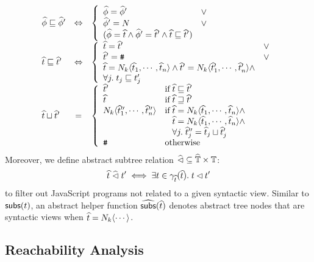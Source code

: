 \[
  \begin{array}{lcl}
    \anode \order \anode' &\Leftrightarrow& \left\{
      \begin{array}{ll}
        \anode = \anode' &\vee\\

        \anode' = \nt &\vee\\

        (\anode = \atree \wedge \anode' = \atree' \wedge \atree \order
        \atree')\\
      \end{array}
    \right.\\

    \atree \order \atree' &\Leftrightarrow& \left\{
      \begin{array}{ll}
        \atree = \atree' &\vee\\

        \atree' = \treetop &\vee\\

        \begin{array}{@{}l@{}}
          \atree = \nt_k \langle \atree_1, \cdots, \atree_n \rangle \wedge
          \atree' = \nt_k \langle \atree'_1, \cdots, \atree'_n \rangle \wedge\\
          \forall j. \; \tree_j \order \tree'_j\\
        \end{array}\\
      \end{array}
    \right.\\

    \atree \join \atree' &=& \left\{
      \begin{array}{ll}
        \atree' & \text{if} \; \atree \order \atree'\\

        \atree & \text{if} \; \atree \revorder \atree'\\

        \nt_k \langle \atree''_1, \cdots, \atree''_n \rangle &
        \text{if} \; \atree = \nt_k \langle \atree_1, \cdots, \atree_n \rangle
        \wedge\\&
        \phantom{\text{if} \;} \atree = \nt_k \langle \atree_1, \cdots, \atree_n
        \rangle \wedge\\&
        \phantom{\text{if} \;} \forall j. \; \atree''_j = \atree_j
        \join \atree'_j\\
        \treetop & \text{otherwise}\\
      \end{array}
    \right.\\
  \end{array}
\]
Moreover, we define abstract subtree relation $\widehat{\lhd} \subseteq \widehat{\mathbb{T}}
\times \mathbb{T}$:
\[
  \widehat{t} \; \widehat{\lhd} \; t' \iff \exists t \in \gamma_{\widehat{t}}(\widehat{t}). \;
  t \lhd t'
\]
to filter out JavaScript programs not related to a given syntactic view.
Similar to $\textsf{subs}(t)$, an abstract helper function $\widehat{\textsf{subs}}(\widehat{t})$
denotes abstract tree nodes that are syntactic views when $\widehat{t} = N_k
\langle \cdots \rangle$.

\subsection{Reachability Analysis}\label{sec:view}

\todo

